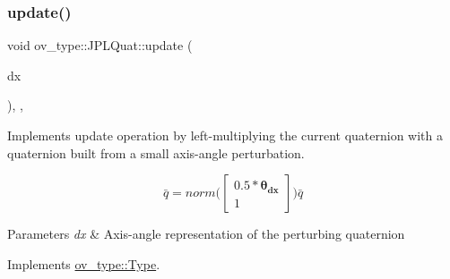 \subsubsection{\texorpdfstring{update()}{update()}}
{\footnotesize\ttfamily void ov\+\_\+type\+::\+J\+P\+L\+Quat\+::update (\begin{DoxyParamCaption}\item[{const Eigen\+::\+Vector\+Xd \&}]{dx }\end{DoxyParamCaption})\hspace{0.3cm}{\ttfamily [inline]}, {\ttfamily [override]}, {\ttfamily [virtual]}}



Implements update operation by left-\/multiplying the current quaternion with a quaternion built from a small axis-\/angle perturbation. 

\[ \bar{q}=norm\Big(\begin{bmatrix} 0.5*\mathbf{\theta_{dx}} \\ 1 \end{bmatrix}\Big) \hat{\bar{q}} \]


\begin{DoxyParams}{Parameters}
{\em dx} & Axis-\/angle representation of the perturbing quaternion \\
\hline
\end{DoxyParams}


Implements \hyperlink{classov__type_1_1Type_a4e133d50af35f07bd97f73590fe31000}{ov\+\_\+type\+::\+Type}.

